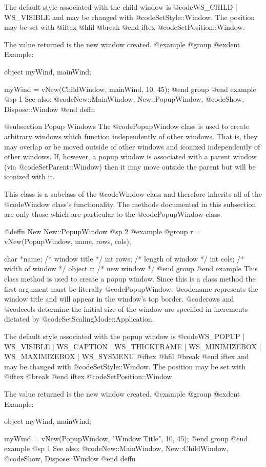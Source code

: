 The default style associated with the child window is
@code{WS_CHILD | WS_VISIBLE} and may be changed with @code{SetStyle::Window}.
The position may be set with 
@iftex
@hfil @break 
@end iftex
@code{SetPosition::Window}.

The value returned is the new window created.
@example
@group
@exdent Example:

object  myWind, mainWind;

myWind = vNew(ChildWindow, mainWind, 10, 45);
@end group
@end example
@sp 1
See also:  @code{New::MainWindow, New::PopupWindow,}
      @code{Show, Dispose::Window}
@end deffn








@subsection Popup Windows
The @code{PopupWindow} class is used to create arbitrary windows which
function independently of other windows.  That is, they may overlap or
be moved outside of other windows and iconized independently of other
windows.  If, however, a popup window is associated with a parent window
(via @code{SetParent::Window}) then it may move outside the parent but
will be iconized with it.

This class is a subclass of the @code{Window} class and therefore
inherits all of the @code{Window} class's functionality.  The methods
documented in this subsection are only those which are particular
to the @code{PopupWindow} class.






@deffn {New} New::PopupWindow
@sp 2
@example
@group
r = vNew(PopupWindow, name, rows, cols);

char    *name;  /*  window title      */
int     rows;   /*  length of window  */
int     cols;   /*  width of window   */
object  r;      /*  new window        */
@end group
@end example
This class method is used to create a popup window.  Since this is a
class method the first argument must be literally @code{PopupWindow}.
@code{name} represents the window title and will appear in the window's
top border.  @code{rows} and @code{cols} determine the initial size of
the window are specified in increments dictated by
@code{SetScalingMode::Application}.

The default style associated with the popup window is @code{WS_POPUP |
WS_VISIBLE | WS_CAPTION | WS_THICKFRAME | WS_MINIMIZEBOX |
WS_MAXIMIZEBOX | WS_SYSMENU} 
@iftex
@hfil @break 
@end iftex
and may be changed with
@code{SetStyle::Window}.  The position may be set with
@iftex
@break 
@end iftex
@code{SetPosition::Window}.

The value returned is the new window created.
@example
@group
@exdent Example:

object  myWind, mainWind;

myWind = vNew(PopupWindow, "Window Title", 10, 45);
@end group
@end example
@sp 1
See also:  @code{New::MainWindow, New::ChildWindow,}
      @code{Show, Dispose::Window}
@end deffn




